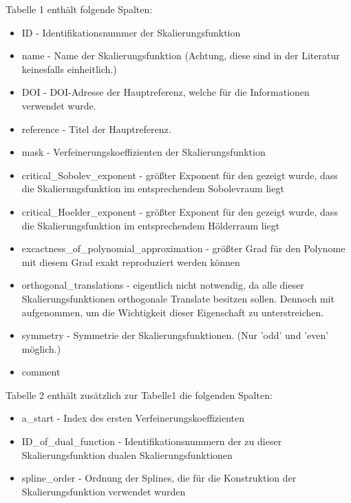 \documentclass[11pt,a4paper,titlepage]{article}
\theoremstyle{plain} %
\theoremstyle{definition} %
\numberwithin{equation}{section} %
\begin{document}
	Tabelle 1  enthält folgende Spalten:
	\begin{itemize}
		\item ID - Identifikationsnummer der Skalierungsfunktion 
		\item name - Name der Skalierungsfunktion (Achtung, diese sind in der Literatur keinesfalls einheitlich.)
		\item DOI - DOI-Adresse der Hauptreferenz, welche für die Informationen verwendet wurde.
		\item reference - Titel der Hauptreferenz.
		\item mask - Verfeinerungskoeffizienten der Skalierungsfunktion
		\item critical\_Sobolev\_exponent - größter Exponent für den gezeigt wurde, dass die Skalierungsfunktion im entsprechendem Sobolevraum liegt
		\item critical\_Hoelder\_exponent - größter Exponent für den gezeigt wurde, dass die Skalierungsfunktion im entsprechendem Hölderraum liegt
		\item excactness\_of\_polynomial\_approximation - größter Grad für den Polynome mit diesem Grad exakt reproduziert werden können
		\item orthogonal\_translations - eigentlich nicht notwendig, da alle dieser Skalierungsfunktionen orthogonale Translate besitzen sollen. Dennoch mit aufgenommen, um die Wichtigkeit dieser Eigenschaft zu unterstreichen.
		\item symmetry - Symmetrie der Skalierungsfunktionen. (Nur 'odd' und 'even' möglich.)
		\item comment
	\end{itemize}
	
	
	Tabelle 2 enthält zusätzlich zur Tabelle1 die folgenden Spalten:
		\begin{itemize}
			\item a\_start - Index des ersten Verfeinerungskoeffizienten
			\item ID\_of\_dual\_function - Identifikationsnummern der zu dieser Skalierungsfunktion dualen Skalierungsfunktionen
			\item spline\_order - Ordnung der Splines, die für die Konstruktion der Skalierungsfunktion verwendet wurden
		\end{itemize}
	
\end{document}

